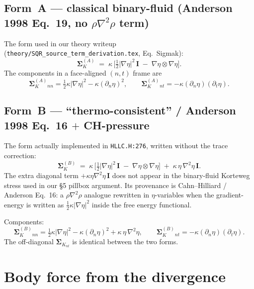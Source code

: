 \documentclass[11pt]{article}
\newcommand{\grad}{\nabla}
\newcommand{\II}{\mathbf{I}}
\newcommand{\SK}{\boldsymbol{\Sigma}_K}
\newcommand{\dxn}{\partial_n}
\begin{document}
\subsection{Form~A --- classical binary-fluid (Anderson 1998 Eq.~19, no
\texorpdfstring{$\rho\grad^2\rho$}{rho grad squared rho} term)}

The form used in our theory writeup
(\texttt{theory/SQR\_source\_term\_derivation.tex}, Eq.~Sigmak):
\begin{equation}
\SK^{(A)} \;=\; \kappa\,\Big[\tfrac{1}{2}|\grad\eta|^2\,\II \;-\; \grad\eta\!\otimes\!\grad\eta\Big].
\label{eq:SigmaA}
\end{equation}
The components in a face-aligned $(n,t)$ frame are
\begin{equation}
\SK^{(A)}_{nn} = \tfrac{1}{2}\kappa|\grad\eta|^2 - \kappa(\dxn\eta)^2,
\qquad
\SK^{(A)}_{nt} = -\kappa(\dxn\eta)(\partial_t\eta).
\label{eq:SigmaAcomp}
\end{equation}

\subsection{Form~B --- ``thermo-consistent'' / Anderson 1998 Eq.~16
\texorpdfstring{$+$}{plus} CH-pressure}

The form actually implemented in \texttt{HLLC.H:276}, written without the
trace correction:
\begin{equation}
\SK^{(B)} \;=\; \kappa\,\Big[\tfrac{1}{2}|\grad\eta|^2\,\II \;-\; \grad\eta\!\otimes\!\grad\eta\Big] \;+\; \kappa\,\eta\,\grad^2\eta\,\II.
\label{eq:SigmaB}
\end{equation}
The extra diagonal term $+\kappa\eta\grad^2\eta\,\II$ does not appear in
the binary-fluid Korteweg stress used in our \S5 pillbox argument. Its
provenance is Cahn--Hilliard / Anderson Eq.~16: a $\rho\grad^2\rho$
analogue rewritten in $\eta$-variables when the gradient-energy is
written as $\tfrac{1}{2}\kappa|\grad\eta|^2$ inside the free energy
functional.

Components:
\begin{equation}
\SK^{(B)}_{nn} = \tfrac{1}{2}\kappa|\grad\eta|^2 - \kappa(\dxn\eta)^2 + \kappa\,\eta\,\grad^2\eta,
\qquad
\SK^{(B)}_{nt} = -\kappa(\dxn\eta)(\partial_t\eta).
\label{eq:SigmaBcomp}
\end{equation}
The off-diagonal $\SK_{nt}$ is identical between the two forms.

\section{Body force from the divergence}
\end{document}
